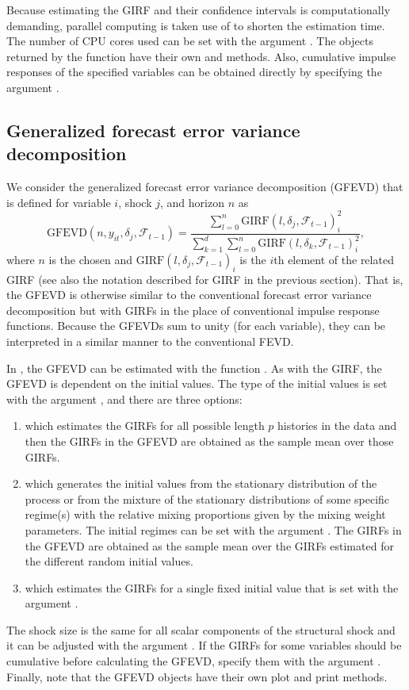 \documentclass[nojss]{jss} %
\begin{document}
Because estimating the GIRF and their confidence intervals is computationally demanding, parallel computing is taken use of to shorten the estimation time. The number of CPU cores used can be set with the argument . The objects returned by the  function have their own  and  methods. Also, cumulative impulse responses of the specified variables can be obtained directly by specifying the argument .

\subsection{Generalized forecast error variance decomposition}
We consider the generalized forecast error variance decomposition (GFEVD) \citep{Lanne+Nyberg:2016}  that is defined for variable $i$, shock $j$, and horizon $n$ as
\begin{equation}
\text{GFEVD}(n,y_{it}, \delta_j,\mathcal{F}_{t-1}) = \frac{\sum_{l=0}^n\text{GIRF}(l,\delta_j,\mathcal{F}_{t-1})_i^2}{\sum_{k=1}^d\sum_{l=0}^n\text{GIRF}(l,\delta_k,\mathcal{F}_{t-1})_i^2},
\end{equation}
where $n$ is the chosen and $\text{GIRF}(l,\delta_j,\mathcal{F}_{t-1})_i$ is the $i$th element of the related GIRF (see also the notation described for GIRF in the previous section). That is, the GFEVD is otherwise similar to the conventional forecast error variance decomposition but with GIRFs in the place of conventional impulse response functions. Because the GFEVDs sum to unity (for each variable), they can be interpreted in a similar manner to the conventional FEVD.

In , the GFEVD can be estimated with the function . As with the GIRF, the GFEVD is dependent on the initial values. The type of the initial values is set with the argument , and there are three options:
\begin{enumerate}
\item {} which estimates the GIRFs for all possible length $p$ histories in the data and then the GIRFs in the GFEVD are obtained as the sample mean over those GIRFs.
\item {} which generates the initial values from the stationary distribution of the process or from the mixture of the stationary distributions of some specific regime(s) with the relative mixing proportions given by the mixing weight parameters. The initial regimes can be set with the argument . The GIRFs in the GFEVD are obtained as the sample mean over the GIRFs estimated for the different random initial values.
\item {} which estimates the GIRFs for a single fixed initial value that is set with the argument .
\end{enumerate}
The shock size is the same for all scalar components of the structural shock and it can be adjusted with the argument . If the GIRFs for some variables should be cumulative before calculating the GFEVD, specify them with the argument . Finally, note that the GFEVD objects have their own plot and print methods.
\end{document}
